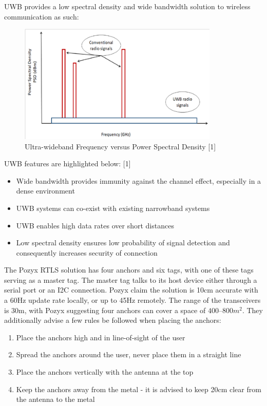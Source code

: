 \documentclass[12pt, a4paper]{article}
\begin{document}
UWB provides a low spectral density and wide bandwidth solution to wireless communication as such:
\begin{figure}[h]
    \centering
    \includegraphics[width=0.85\textwidth]{UWB vs PSD.png}
    \caption{Ultra-wideband Frequency versus Power Spectral Density [1]}
    \label{fig:uwb_psd}
\end{figure}
\newline
UWB features are highlighted below: [1]
\begin{itemize}
    \item Wide bandwidth provides immunity against the channel effect, especially in a dense environment
    \item UWB systems can co-exist with existing narrowband systems
    \item UWB enables high data rates over short distances
    \item Low spectral density ensures low probability of signal detection and consequently increases security of connection
\end{itemize}
The Pozyx RTLS solution has four anchors and six tags, with one of these tags serving as a master tag. The master tag talks to its host device either through a serial port or an I2C connection. Pozyx claim the solution is 10cm accurate with a 60Hz update rate locally, or up to 45Hz remotely. The range of the transceivers is 30m, with Pozyx suggesting four anchors can cover a space of $400 – 800m^2$. They additionally advise a few rules be followed when placing the anchors:
\begin{enumerate}
    \item Place the anchors high and in line-of-sight of the user
    \item Spread the anchors around the user, never place them in a straight line
    \item Place the anchors vertically with the antenna at the top
    \item Keep the anchors away from the metal - it is advised to keep 20cm clear from the antenna to the metal
\end{enumerate}
\end{document}
